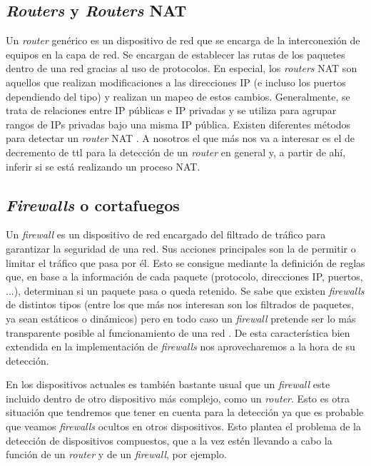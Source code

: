 \documentclass[tfg,epsbased,lof,lot,loa,covers,final,copyright,overleaf]{tfgtfmthesisuam}
\begin{document}
\subsection{\textit{Routers} y \textit{Routers} NAT}
Un \textit{router} genérico es un dispositivo de red que se encarga de la interconexión de equipos en la capa de red. Se encargan de establecer las rutas de los paquetes dentro de una red gracias al uso de protocolos. En especial, los \textit{routers} NAT son aquellos que realizan modificaciones a las direcciones IP (e incluso los puertos dependiendo del tipo) y realizan un mapeo de estos cambios. Generalmente, se trata de relaciones entre IP públicas e IP privadas y se utiliza para agrupar rangos de IPs privadas bajo una misma IP pública. Existen diferentes métodos para detectar un \textit{router} NAT \cite{Krmicek}. A nosotros el que más nos va a interesar es el de decremento de \gls{ttl} para la detección de un \textit{router} en general y, a partir de ahí, inferir si se está realizando un proceso NAT.

\subsection{\textit{Firewalls} o cortafuegos}
\label{subsec:Estado:Deteccion:Firewalls}
Un \textit{firewall} es un dispositivo de red encargado del filtrado de tráfico para garantizar la seguridad de una red. Sus acciones principales son la de permitir o limitar el tráfico que pasa por él. Esto se consigue mediante la definición de reglas que, en base a la información de cada paquete (protocolo, direcciones IP, puertos, ...), determinan si un paquete pasa o queda retenido. Se sabe que existen \textit{firewalls} de distintos tipos (entre los que más nos interesan son los filtrados de paquetes, ya sean estáticos o dinámicos) pero en todo caso un \textit{firewall} pretende ser lo más transparente posible al funcionamiento de una red \cite{Cheswick2003}. De esta característica bien extendida en la implementación de \textit{firewalls} nos aprovecharemos a la hora de su detección.

En los dispositivos actuales es también bastante usual que un \textit{firewall} este incluido dentro de otro dispositivo más complejo, como un \textit{router}. Esto es otra situación que tendremos que tener en cuenta para la detección ya que es probable que veamos \textit{firewalls} ocultos en otros dispositivos. Esto plantea el problema de la detección de dispositivos compuestos, que a la vez estén llevando a cabo la función de un \textit{router} y de un \textit{firewall}, por ejemplo.
\end{document}
